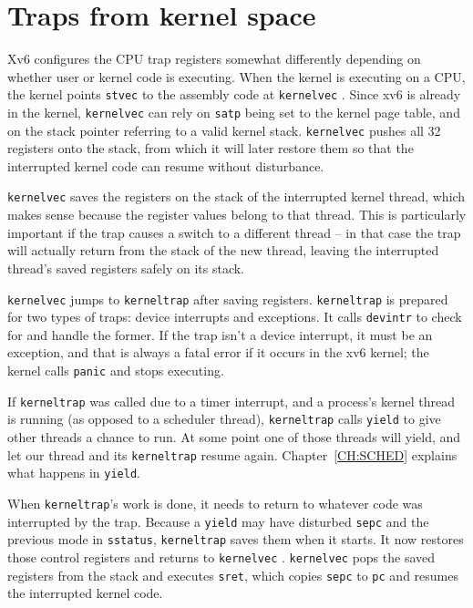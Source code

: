 \section{Traps from kernel space}
\label{s:ktraps}

Xv6 configures the CPU trap registers somewhat differently depending
on whether user or kernel code is executing.
When the kernel is executing on a CPU, the kernel points {\tt stvec}
to the assembly code at {\tt kernelvec}
.
Since xv6 is already in the kernel, {\tt kernelvec} can rely
on {\tt satp} being set to the kernel page table, and on the
stack pointer referring to a valid kernel stack.
{\tt kernelvec} pushes all 32 registers onto the stack,
from which it will later restore them
so that the interrupted
kernel code can resume without disturbance.

{\tt kernelvec} saves the registers on the stack of the interrupted
kernel thread, which makes sense because the register values belong to
that thread. This is particularly important if the trap causes a
switch to a different thread -- in that case the trap will actually
return from the stack of the new thread, leaving the interrupted
thread's saved registers safely on its stack.

{\tt kernelvec} jumps to {\tt kerneltrap}
 after saving registers.
{\tt kerneltrap} is prepared for two types of traps:
device interrupts and exceptions. It calls
{\tt devintr}
to check for and handle the former.
If the trap isn't a device interrupt, it must be an exception,
and that is always a fatal error if it occurs in the xv6 kernel;
the kernel calls \lstinline{panic} and stops executing.

If {\tt kerneltrap} was called due to a timer interrupt, and a
process's kernel thread is running (as opposed to a scheduler thread),
{\tt kerneltrap} calls {\tt yield} to give other threads a chance to
run. At some point one of those threads will yield, and let our thread
and its {\tt kerneltrap} resume again.
Chapter~\ref{CH:SCHED} explains what happens in {\tt yield}.

When {\tt kerneltrap}'s work is done, it needs to return to whatever
code was interrupted by the trap. Because a {\tt yield} may have
disturbed {\tt sepc} and the previous mode in {\tt sstatus},
{\tt kerneltrap} saves them when it starts. It now restores those
control registers and returns to {\tt kernelvec}
.
{\tt kernelvec} pops the saved registers from the stack and
executes {\tt sret}, which copies {\tt sepc} to {\tt pc}
and resumes the interrupted kernel code.

